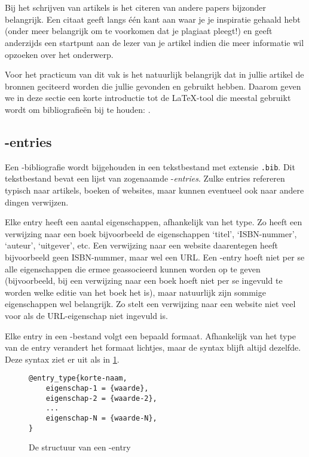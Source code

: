 \documentclass[12pt, dutch]{article}
\begin{document}
\section{\BibTeX}\label{sec:bibtex}

Bij het schrijven van artikels is het citeren van andere papers
bijzonder belangrijk. Een citaat geeft langs \'e\'en kant aan waar je
je inspiratie gehaald hebt (onder meer belangrijk om te voorkomen dat
je plagiaat pleegt!) en geeft anderzijds een startpunt aan de lezer
van je artikel indien die meer informatie wil opzoeken over het
onderwerp.

Voor het practicum van dit vak is het natuurlijk belangrijk dat in
jullie artikel de bronnen geciteerd worden die jullie gevonden en
gebruikt hebben. Daarom geven we in deze sectie een korte introductie
tot de \LaTeX{}-tool die meestal gebruikt wordt om bibliografie\"en
bij te houden: \BibTeX.

\subsection{\BibTeX-entries}

Een \BibTeX-bibliografie wordt bijgehouden in een tekstbestand met
extensie \texttt{.bib}. Dit tekstbestand bevat een lijst van
zogenaamde \BibTeX-\emph{entries}. Zulke entries refereren
typisch naar artikels, boeken of websites, maar kunnen eventueel ook
naar andere dingen verwijzen.

Elke entry heeft een aantal eigenschappen, afhankelijk van
het type. Zo heeft een verwijzing naar een boek bijvoorbeeld de
eigenschappen `titel', `ISBN-nummer', `auteur', `uitgever', etc. Een
verwijzing naar een website daarentegen heeft bijvoorbeeld geen
ISBN-nummer, maar wel een URL. Een \BibTeX-entry hoeft niet per se
alle eigenschappen die ermee geassocieerd kunnen worden op te geven
(bijvoorbeeld, bij een verwijzing naar een boek hoeft niet per se
ingevuld te worden welke editie van het boek het is), maar
natuurlijk zijn sommige eigenschappen wel belangrijk. Zo stelt een
verwijzing naar een website niet veel voor als de URL-eigenschap
niet ingevuld is.

Elke entry in een \BibTeX-bestand volgt een bepaald formaat.
Afhankelijk van het type van de entry verandert het formaat lichtjes,
maar de syntax blijft altijd dezelfde. Deze syntax ziet er uit als in
\cref{fig:bibtexstructure}.

\begin{figure}
  \begin{verbatim}
@entry_type{korte-naam,
    eigenschap-1 = {waarde},
    eigenschap-2 = {waarde-2},
    ...
    eigenschap-N = {waarde-N},
}
\end{verbatim}
  \caption{De structuur van een \BibTeX-entry}
  \label{fig:bibtexstructure}
\end{figure}
\end{document}
